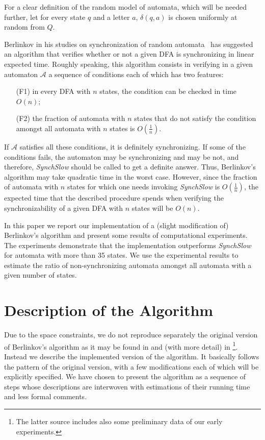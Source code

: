 \documentclass{llncs}
\begin{document}
For a clear definition of the random model of automata, which will be needed further, let for every state $q$ and a letter $a$, $\delta(q,a)$ is chosen uniformly at random from $Q$.

Berlinkov in his studies on synchronization of random automata~\cite{Berlinkov:preprint,berl} has suggested an algorithm that verifies whether or not a given DFA is synchronizing in linear expected time. Roughly speaking, this algorithm consists in verifying in a given automaton $\mathcal{A}$ a sequence of conditions each of which has two features:
\begin{itemize}
\item[(F1)] in every DFA with $n$ states, the condition can be checked in time $O(n)$;
\item[(F2)] the fraction of automata with $n$ states that do not satisfy the condition amongst all automata with $n$ states is $O(\frac1n)$.
 \end{itemize}
If $\mathcal{A}$ satisfies all these conditions, it is definitely synchronizing. If some of the conditions fails, the automaton may be synchronizing and may be not, and therefore, \emph{SynchSlow} should be called to get a definite answer. Thus, Berlinkov's algorithm may take quadratic time in the worst case. However, since the fraction of automata with $n$ states for which one needs invoking \emph{SynchSlow} is $O(\frac1n)$, the expected time that the described procedure spends when verifying the synchronizability of a given DFA with $n$ states will be $O(n)$.

In this paper we report our implementation of a (slight modification of) Berlinkov's algorithm and present some results of computational experiments. The experiments demonstrate that the implementation outperforms \emph{SynchSlow} for automata with more than 35 states. We use the experimental results to estimate the ratio of non-synchronizing automata amongst all automata with a given number of states.

\section{Description of the Algorithm}

Due to the space constraints, we do not reproduce separately the original version of Ber\-lin\-kov's algorithm as it may be found in \cite[Section~2]{berl} and (with more detail) in \cite[Section~4]{Berlinkov:preprint}\footnote{The latter source includes also some preliminary data of our early experiments.}. Instead we describe the implemented version of the algorithm. It basically follows the pattern of the original version, with a few modifications each of which will be explicitly specified. We have chosen to present the algorithm as a sequence of steps whose descriptions are interwoven with estimations of their running time and less formal comments.
\end{document}
